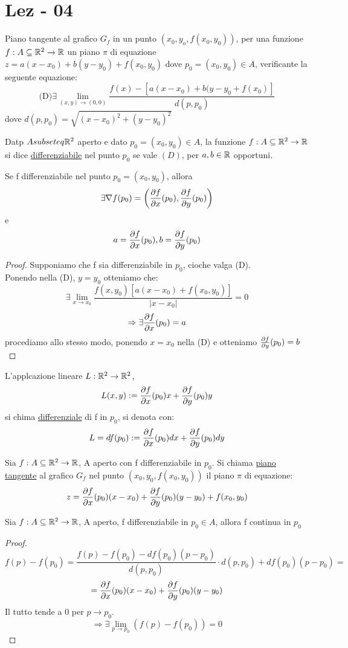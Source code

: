 \section{Lez - 04}
Piano tangente al grafico $G_f$ in un punto $\left(x_0,y_o,f(x_0,y_0)\right)$, per una funzione $f: A \subseteq \mathbb{R}^2 \to \mathbb{R}$ \ace un piano 
$\pi$ di equazione $z=a(x-x_0)+b(y-y_0)+f(x_0,y_0)$ dove $p_0 = (x_0,y_0)\in A$, verificante la seguente equazione:
$$\text{(D)} \exists \lim_{(x,y)\to (0,0)}\frac{f(x)-\left[a(x-x_0)+b(y-y_0+f(x_0)\right]}{d(p,p_0)}$$
dove $d(p,p_0) = \sqrt{(x-x_0)^2+(y-y_0)^2}$
\begin{definition}
  Datp $A subseteq \mathbb{R}^2$ aperto e dato $p_0=(x_0,y_0)\in A$, la funzione $f: A \subseteq \mathbb{R}^2 \to \mathbb{R}$ si dice \underline{differenziabile}
  nel punto $p_0$ se vale $(D)$, per $a,b \in \mathbb{R}$ opportuni.
\end{definition}
\begin{proposition}
  Se f \ace differenziabile nel punto $p_0 =(x_0,y_0)$, allora $$\exists\nabla f(p_0) = \left(\frac{\partial f}{\partial x}(p_0), \frac{\partial f}{\partial y}(p_0)\right)$$
  e $$a = \frac{\partial f}{\partial x}(p_0) , b =\frac{\partial f}{\partial y}(p_0) $$
  \begin{proof}
    Supponiamo che f sia differenziabile in $p_0$, cio\ace che valga (D). \\
    Ponendo nella (D), $y = y_0$ otteniamo che:
    $$\exists \lim_{x\to x_0} \frac{f(x,y_0) \left[a(x-x_0)+f(x_0,y_0)\right]}{\lvert x -x_0\rvert} = 0$$
    $$\Rightarrow \exists\frac{\partial f}{\partial x}(p_0) = a$$
    procediamo allo stesso modo, ponendo $x=x_0$ nella (D) e otteniamo $\frac{\partial f}{\partial y}(p_0) = b$
  \end{proof}
\end{proposition}
\begin{definition}
  L'applcazione lineare $L:\mathbb{R}^2\to\mathbb{R}^2$, $$L(x,y) := \frac{\partial f}{\partial x}(p_0) x + \frac{\partial f}{\partial y}(p_0) y$$ si chima \underline{differenziale} di f in $p_0$, si denota
  con: $$L = df(p_0) := \frac{\partial f}{\partial x}(p_0) dx + \frac{\partial f}{\partial y}(p_0) dy$$
\end{definition}
\begin{definition}
  Sia $f: A \subseteq \mathbb{R}^2 \to \mathbb{R}$, A aperto con f differenziabile in $p_0$. Si chiama \underline{piano tangente} al grafico $G_f$ nel 
  punto $(x_0,y_0,f(x_0,y_0))$ il piano $\pi$ di equazione:
  $$z = \frac{\partial f}{\partial x}(p_0) (x-x_0) + \frac{\partial f}{\partial y}(p_0) (y-y_0) + f(x_0,y_0)$$
\end{definition}
\begin{theorem}
  Sia $f: A \subseteq \mathbb{R}^2 \to \mathbb{R}$, A aperto, f differenziabile in $p_0 \in A$, allora f \ace continua in $p_0$
  \begin{proof}
    $$f(p)-f(p_0) = \frac{f(p)-f(p_0)-df(p_0)(p-p_0)}{d(p,p_0)} \cdot d(p,p_0) + df(p_0)(p-p_0) = $$
    $$= \frac{\partial f}{\partial x}(p_0) (x-x_0) + \frac{\partial f}{\partial y}(p_0) (y-y_0)$$
    Il tutto tende a 0 per $p\to p_0$.\\
    $$\Rightarrow \exists \lim_{p\to p_0} \left(f(p)-f(p_0)\right) = 0$$
  \end{proof}
\end{theorem}

